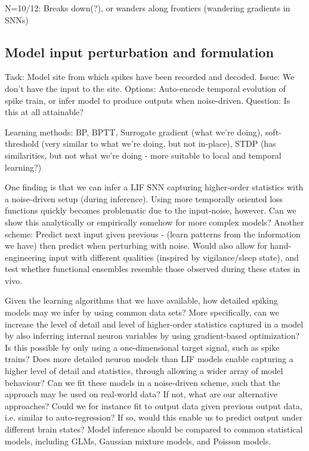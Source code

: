\documentclass[mphil,deptreport,ai]{infthesis} %
\begin{document}
N=10/12: Breaks down(?), or wanders along frontiers (wandering gradients in SNNs)

\subsection{Model input perturbation and formulation}

Task: Model site from which spikes have been recorded and decoded. Issue: We don’t have the input to the site. Options: Auto-encode temporal evolution of spike train, or infer model to produce outputs when noise-driven. Question: Is this at all attainable?

Learning methods:
BP, BPTT, Surrogate gradient (what we’re doing), soft-threshold (very similar to what we’re doing, but not in-place), STDP (has similarities, but not what we’re doing - more suitable to local and temporal learning?)

One finding is that we can infer a LIF SNN capturing higher-order statistics with a noise-driven setup (during inference). Using more temporally oriented loss functions quickly becomes problematic due to the input-noise, however. Can we show this analytically or empirically somehow for more complex models?
Another scheme: Predict next input given previous - (learn patterns from the information we have) then predict when perturbing with noise. Would also allow for hand-engineering input with different qualities (inspired by vigilance/sleep state), and test whether functional ensembles resemble those observed during these states in vivo.

Given the learning algorithms that we have available, how detailed spiking models may we infer by using common data sets? More specifically, can we increase the level of detail and level of higher-order statistics captured in a model by also inferring internal neuron variables by using gradient-based optimization? Is this possible by only using a one-dimensional target signal, such as spike trains? Does more detailed neuron models than LIF models enable capturing a higher level of detail and statistics, through allowing a wider array of model behaviour? Can we fit these models in a noise-driven scheme, such that the approach may be used on real-world data? If not, what are our alternative approaches? Could we for instance fit to output data given previous output data, i.e. similar to auto-regression? If so, would this enable us to predict output under different brain states?
Model inference should be compared to common statistical models, including GLMs, Gaussian mixture models, and Poisson models.
\end{document}
